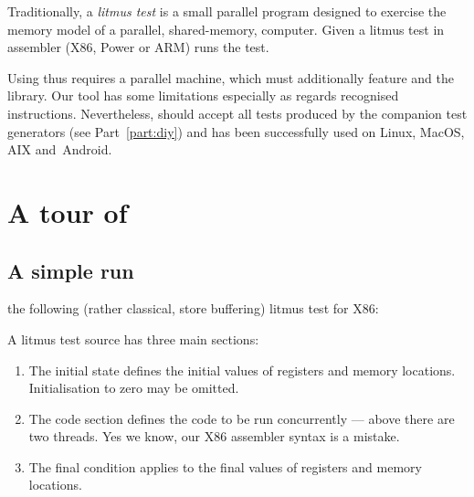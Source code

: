 Traditionally, a \emph{litmus test} is a small parallel program designed
to exercise the memory model of a parallel, shared-memory, computer.
Given a litmus test in assembler (X86, Power or ARM) \litmus{}
runs the test.

Using \litmus{} thus requires a parallel machine,
which must additionally feature  and the  library.
Our tool \litmus{} has some limitations especially
as regards recognised instructions.
Nevertheless, \litmus{} should accept all tests
produced by the companion test generators (see Part~\ref{part:diy})
and has been successfully used on Linux, MacOS, AIX and~Android.


\section{A tour of~\litmus{}}

\subsection{A \label{litmus:simple} simple run}
 the following (rather classical, store buffering)
 litmus test for X86:

A litmus test source has three main sections:
\begin{enumerate}
\item The initial state defines the initial values of registers
and memory locations. Initialisation to zero may be omitted.
\item The code section defines the code to be run concurrently
--- above there are two threads.
Yes we know, our X86 assembler syntax is a mistake.
\item The final condition applies to the final values
of registers and memory locations.
\end{enumerate}

